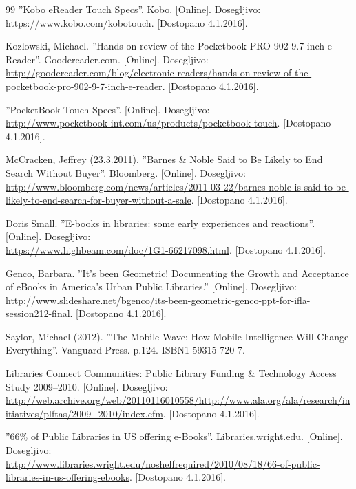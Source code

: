 \documentclass[a4paper, 12pt]{book}
\begin{document}
\begin{thebibliography}{99}
''Kobo eReader Touch Specs''. Kobo.
[Online]. Dosegljivo:\\ 
\url{https://www.kobo.com/kobotouch}.
[Dostopano 4.1.2016].

 Kozlowski, Michael. ''Hands on review of the Pocketbook PRO 902 9.7 inch e-Reader''. Goodereader.com. 
[Online]. Dosegljivo:\\ \url{http://goodereader.com/blog/electronic-readers/hands-on-review-of-the-pocketbook-pro-902-9-7-inch-e-reader}.
[Dostopano 4.1.2016].

 ''PocketBook Touch Specs''. 
[Online]. Dosegljivo:\\ 
\url{http://www.pocketbook-int.com/us/products/pocketbook-touch}.
[Dostopano 4.1.2016].

 McCracken, Jeffrey (23.3.2011). ''Barnes \& Noble Said to Be Likely to End Search Without Buyer''. Bloomberg.
[Online]. Dosegljivo:\\ \url{http://www.bloomberg.com/news/articles/2011-03-22/barnes-noble-is-said-to-be-likely-to-end-search-for-buyer-without-a-sale}.
[Dostopano 4.1.2016].

 Doris Small. ''E-books in libraries: some early experiences and reactions''.
[Online]. Dosegljivo:\\ 
\url{https://www.highbeam.com/doc/1G1-66217098.html}.
[Dostopano 4.1.2016].
 
 Genco, Barbara. ''It's been Geometric! Documenting the Growth and Acceptance of eBooks in America's Urban Public Libraries.'' 
[Online]. Dosegljivo:\\ \url{http://www.slideshare.net/bgenco/its-been-geometric-genco-ppt-for-ifla-session212-final}.
[Dostopano 4.1.2016].

 Saylor, Michael (2012). ''The Mobile Wave: How Mobile Intelligence Will Change Everything''. Vanguard Press. p.124. ISBN1-59315-720-7. 

 Libraries Connect Communities: Public Library Funding \& Technology Access Study 2009–2010.
[Online]. Dosegljivo:\\ 
\url{http://web.archive.org/web/20110116010558/http://www.ala.org/ala/research/initiatives/plftas/2009\_2010/index.cfm}.
[Dostopano 4.1.2016].

 ''66\% of Public Libraries in US offering e-Books''. Libraries.wright.edu.
[Online]. Dosegljivo:\\ \url{http://www.libraries.wright.edu/noshelfrequired/2010/08/18/66-of-public-libraries-in-us-offering-ebooks}.
[Dostopano 4.1.2016].


\end{thebibliography}
\end{document}
